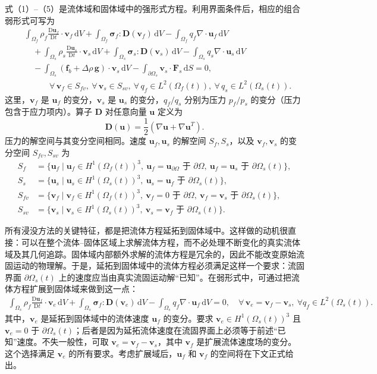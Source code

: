 \documentclass[UTF8,11pt,a4paper]{ctexart}
\newcommand{\dd}{\,\mathrm{d}}
\newcommand{\D}{\mathrm{D}}
\begin{document}
式（1）--（5）是流体域和固体域中的强形式方程。利用界面条件后，相应的组合弱形式可写为
\begin{align}
&\int_{\Omega_f}\rho_f\frac{\D\bm u_f}{\D t}\cdot\bm v_f\dd V
+\int_{\Omega_f}\bm\sigma_f:\bm D(\bm v_f)\dd V
-\int_{\Omega_f}q_f\nabla\cdot\bm u_f\dd V \nonumber\\
&\quad+\int_{\Omega_s}\rho_s\frac{\D\bm u_s}{\D t}\cdot\bm v_s\dd V
+\int_{\Omega_s}\bm\sigma_s:\bm D(\bm v_s)\dd V
-\int_{\Omega_s}q_s\nabla\cdot\bm u_s\dd V \nonumber\\
&\quad-\int_{\Omega_s}(\bm f_b+\Delta\rho\,\bm g)\cdot\bm v_s\dd V
-\int_{\partial\Omega_s}\bm v_s\cdot\bm F_s\dd S=0, \nonumber\\[-0.2em]
&\hspace{3em}\forall\,\bm v_f\in S_{fv},\ \forall\,\bm v_s\in S_{sv},\ \forall\,q_f\in L^2(\Omega_f(t)),\ \forall\,q_s\in L^2(\Omega_s(t)). \tag{6}
\end{align}
这里，$\bm v_f$ 是 $\bm u_f$ 的变分，$\bm v_s$ 是 $\bm u_s$ 的变分，$q_f/q_s$ 分别为压力 $p_f/p_s$ 的变分（压力包含于应力项内）。算子 $\bm D$ 对任意向量 $\bm u$ 定义为
\[
\bm D(\bm u)=\frac12\left(\nabla\bm u+\nabla\bm u^{T}\right).
\]
压力的解空间与其变分空间相同。速度 $\bm u_f,\bm u_s$ 的解空间 $S_f,S_s$，以及 $\bm v_f,\bm v_s$ 的变分空间 $S_{fv},S_{sv}$ 为
\begin{align}
S_f&=\{\bm u_f\mid \bm u_f\in H^1(\Omega_f(t))^3,\ \bm u_f=\bm u_{\partial\Omega}\text{ 于 }\partial\Omega,\ \bm u_f=\bm u_s\text{ 于 }\partial\Omega_s(t)\}, \tag{7}\\
S_s&=\{\bm u_s\mid \bm u_s\in H^1(\Omega_s(t))^3,\ \bm u_s=\bm u_f\text{ 于 }\partial\Omega_s(t)\}, \tag{8}\\
S_{fv}&=\{\bm v_f\mid \bm v_f\in H^1(\Omega_f(t))^3,\ \bm v_f=0\text{ 于 }\partial\Omega,\ \bm v_f=\bm v_s\text{ 于 }\partial\Omega_s(t)\}, \tag{9}\\
S_{sv}&=\{\bm v_s\mid \bm v_s\in H^1(\Omega_s(t))^3,\ \bm v_s=\bm v_f\text{ 于 }\partial\Omega_s(t)\}. \tag{10}
\end{align}

所有浸没方法的关键特征，都是把流体方程延拓到固体域中。这样做的动机很直接：可以在整个流体--固体区域上求解流体方程，而不必处理不断变化的真实流体域及其几何追踪。固体域内部额外求解的流体方程是冗余的，因此不能改变原始流固运动的物理解。于是，延拓到固体域中的流体方程必须满足这样一个要求：流固界面 $\partial\Omega_s(t)$ 上的速度应当由真实流固运动解“已知”。在弱形式中，可通过把流体方程扩展到固体域来做到这一点：
\begin{align}
\int_{\Omega_s}\rho_f\frac{\D\bm u_f}{\D t}\cdot\bm v_e\dd V
+\int_{\Omega_s}\bm\sigma_f:\bm D(\bm v_e)\dd V
-\int_{\Omega_s}q_f\nabla\cdot\bm u_f\dd V=0,
\quad \forall\,\bm v_e=\bm v_f-\bm v_s,\ \forall q_f\in L^2(\Omega_s(t)). \tag{11}
\end{align}
其中，$\bm v_e$ 是延拓到固体域中的流体速度 $\bm u_f$ 的变分。要求 $\bm v_e\in H^1(\Omega_s(t))^3$ 且 $\bm v_e=0$ 于 $\partial\Omega_s(t)$；后者是因为延拓流体速度在流固界面上必须等于前述“已知”速度。不失一般性，可取 $\bm v_e=\bm v_f-\bm v_s$，其中 $\bm v_f$ 是扩展流体速度场的变分。这个选择满足 $\bm v_e$ 的所有要求。考虑扩展域后，$\bm u_f$ 和 $\bm v_f$ 的空间将在下文正式给出。
\end{document}
